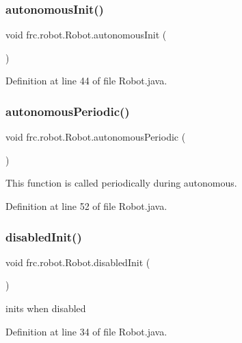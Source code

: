 \subsubsection{\texorpdfstring{autonomous\+Init()}{autonomousInit()}}
{\footnotesize\ttfamily void frc.\+robot.\+Robot.\+autonomous\+Init (\begin{DoxyParamCaption}{ }\end{DoxyParamCaption})}



Definition at line 44 of file Robot.\+java.

\mbox{\label{classfrc_1_1robot_1_1Robot_a7dcfe7d0d65d1051eb095b8eb1aebd72}} 
\subsubsection{\texorpdfstring{autonomous\+Periodic()}{autonomousPeriodic()}}
{\footnotesize\ttfamily void frc.\+robot.\+Robot.\+autonomous\+Periodic (\begin{DoxyParamCaption}{ }\end{DoxyParamCaption})}



This function is called periodically during autonomous. 



Definition at line 52 of file Robot.\+java.

\mbox{\label{classfrc_1_1robot_1_1Robot_ac19810fbf26efd4cd47cbd7568b4ad2a}} 
\subsubsection{\texorpdfstring{disabled\+Init()}{disabledInit()}}
{\footnotesize\ttfamily void frc.\+robot.\+Robot.\+disabled\+Init (\begin{DoxyParamCaption}{ }\end{DoxyParamCaption})}

inits when disabled 

Definition at line 34 of file Robot.\+java.

